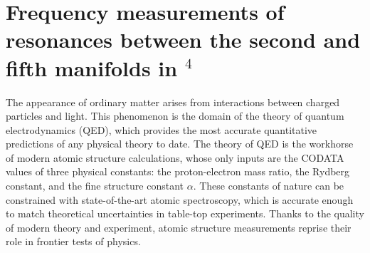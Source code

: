 





\chapter{Frequency measurements of resonances between the second and fifth manifolds in {$^4$}\mhe}
\label{chap:transitions}





  {The} appearance of ordinary matter arises from interactions between charged particles and light.
	This phenomenon is the domain of the theory of quantum electrodynamics (QED), which provides the most accurate quantitative predictions of any physical theory to date.
	The theory of QED is the workhorse of modern atomic structure calculations, whose only inputs are the CODATA values of three physical constants: the proton-electron mass ratio, the Rydberg constant, and the fine structure constant $\alpha$.
	These constants of nature can be constrained with state-of-the-art atomic spectroscopy, which is accurate enough to match theoretical uncertainties in table-top experiments.
	Thanks to the quality of modern theory and experiment, atomic structure measurements reprise their role in frontier tests of physics.
	
